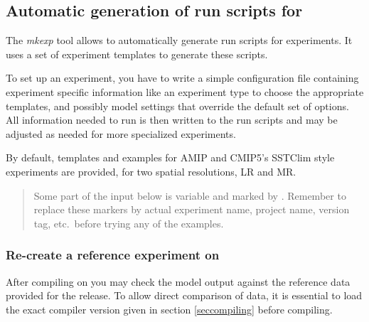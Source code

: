 \subsection[Automatic generation of run scripts for \echambw]{Automatic generation of run scripts for \echam}
\label{runscripts:generation}

The \emph{mkexp} tool allows to automatically generate run scripts for \echam{}
experiments. It uses a set of experiment templates to generate these scripts.

To set up an experiment, you have to write a simple configuration file
containing experiment specific information like an experiment type to choose
the appropriate templates, and possibly model settings that override the
default set of options. All information needed to run \echam{} is then written
to the run scripts and may be adjusted as needed for more specialized
experiments.

By default, templates and examples for AMIP and CMIP5's SSTClim style
experiments are provided, for two spatial resolutions, LR and MR.

\begin{quote}
  \colorbox{dgray}{\parbox{\linewidth}{Some part of the input below is variable
      and marked by . Remember to replace these
      markers by actual experiment name, project name, version tag, etc.\ before
      trying any of the examples.}}
\end{quote}

\subsubsection{Re-create a reference experiment on \blizzard}
\label{runscripts:generation:reference_run}

After compiling \echam{} on \blizzard{} you may check the model output
against the reference data provided for the release. To allow direct comparison
of data, it is essential to load the exact compiler version given in section
\ref{seccompiling} before compiling.


